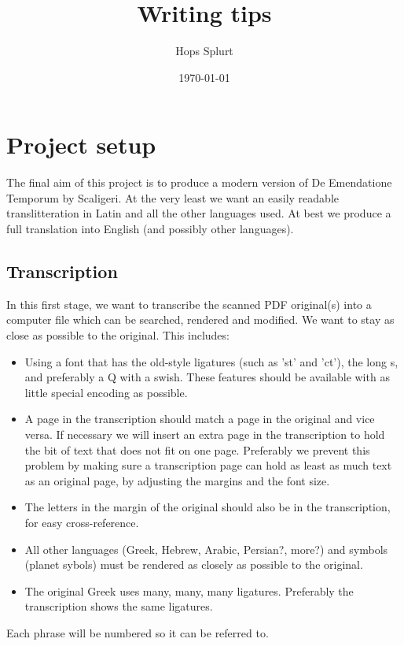 \documentclass[12pt]{report}
\title{Writing tips}
\author{Hops Splurt}
\date{\today}                                           %
\begin{document}
\maketitle




\chapter{Project setup}
The final aim of this project is to produce a modern version of De Emendatione Temporum by Scaligeri. At the very
least we want an easily readable translitteration in Latin and all the other languages used. At best we produce
a full translation into English (and possibly other languages).

\section{Transcription}
In this first stage, we want to transcribe the scanned PDF original(s) into a computer file which can be searched, rendered
and modified. We want to stay as close as possible to the original. This includes:
\begin{itemize}
\item Using a font that has the old-style ligatures (such as 'st' and 'ct'), the long s, and preferably a Q with a swish. These
features should be available with as little special encoding as possible.
\item A page in the transcription should match a page in the original and vice versa. If necessary we will insert an
extra page in the transcription to hold the bit of text that does not fit on one page. Preferably we prevent this problem
by making sure a transcription page can hold as least as much text as an original page, by adjusting the margins
and the font size.
\item The letters in the margin of the original should also be in the transcription, for easy cross-reference.
\item All other languages (Greek, Hebrew, Arabic, Persian?, more?) and symbols (planet sybols) must be rendered
as closely as possible to the original.
\item The original Greek uses many, many, many ligatures. Preferably the transcription shows the same ligatures.
\end{itemize}
Each phrase will be numbered so it can be referred to.
\end{document}
